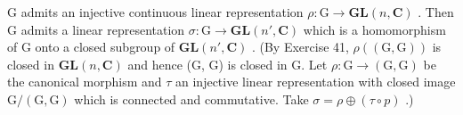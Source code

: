 G admits an injective continuous linear representation \(\rho: \mathrm{G} \to \mathbf{GL}(n, \mathbf{C})\) . Then G admits a linear representation \(\sigma: \mathrm{G} \to \mathbf{GL}(n', \mathbf{C})\) which is a homomorphism of G onto a closed subgroup of \(\mathbf{GL}(n', \mathbf{C})\) . (By Exercise 41, \(\rho((\mathrm{G}, \mathrm{G}))\) is closed in \(\mathbf{GL}(n, \mathbf{C})\) and hence (G, G) is closed in G. Let \(\rho: \mathrm{G} \to (\mathrm{G}, \mathrm{G})\) be the canonical morphism and \(\tau\) an injective linear representation with closed image \(\mathrm{G}/(\mathrm{G}, \mathrm{G})\) which is connected and commutative. Take \(\sigma = \rho \oplus (\tau \circ p)\) .)

